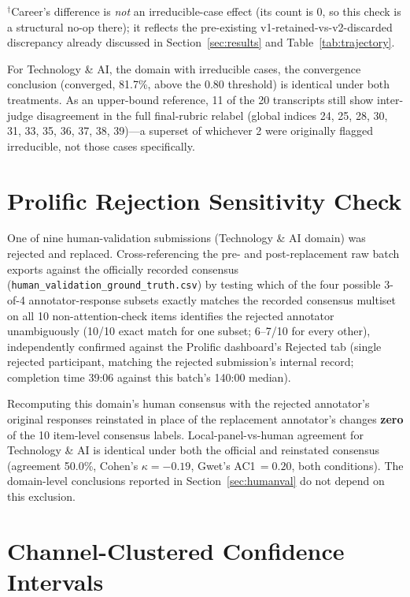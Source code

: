\documentclass[11pt]{article}
\begin{document}
$^\dagger$Career's difference is \emph{not} an irreducible-case effect
(its count is 0, so this check is a structural no-op there); it reflects
the pre-existing v1-retained-vs-v2-discarded discrepancy already discussed
in Section~\ref{sec:results} and Table~\ref{tab:trajectory}.

For Technology \& AI, the domain with irreducible cases, the convergence
conclusion (converged, 81.7\%, above the 0.80 threshold) is identical under
both treatments. As an upper-bound reference, 11 of the 20 transcripts
still show inter-judge disagreement in the full final-rubric relabel
(global indices 24, 25, 28, 30, 31, 33, 35, 36, 37, 38, 39)---a superset of
whichever 2 were originally flagged irreducible, not those cases
specifically.

\section{Prolific Rejection Sensitivity Check}
\label{app:prolific}

One of nine human-validation submissions (Technology \& AI domain) was
rejected and replaced. Cross-referencing the pre- and post-replacement
raw batch exports against the officially recorded consensus
(\texttt{human\_validation\_ground\_truth.csv}) by testing which of the
four possible 3-of-4 annotator-response subsets exactly matches the
recorded consensus multiset on all 10 non-attention-check items identifies
the rejected annotator unambiguously (10/10 exact match for one subset;
6--7/10 for every other), independently confirmed against the Prolific
dashboard's Rejected tab (single rejected participant, matching the
rejected submission's internal record; completion time 39:06 against this
batch's 140:00 median).

Recomputing this domain's human consensus with the rejected annotator's
original responses reinstated in place of the replacement annotator's
changes \textbf{zero} of the 10 item-level consensus labels. Local-panel-vs-human
agreement for Technology \& AI is identical under both the official and
reinstated consensus (agreement 50.0\%, Cohen's $\kappa=-0.19$, Gwet's
AC1\,$=0.20$, both conditions). The domain-level conclusions reported in
Section~\ref{sec:humanval} do not depend on this exclusion.

\section{Channel-Clustered Confidence Intervals}
\label{app:channelci}
\end{document}
